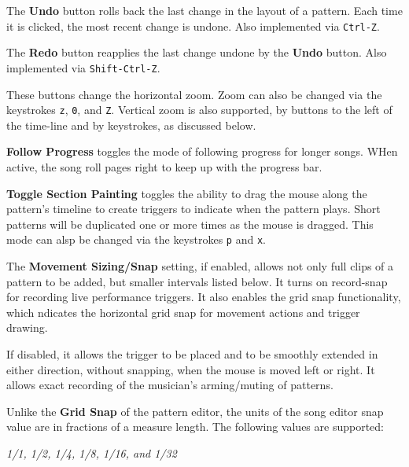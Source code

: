    The \textbf{Undo} button rolls back the last change in the layout of a
   pattern.  Each time it is clicked, the most recent change is undone.
   Also implemented via \texttt{Ctrl-Z}.

   The \textbf{Redo} button reapplies the last change undone by
   the \textbf{Undo} button.
   Also implemented via \texttt{Shift-Ctrl-Z}.

   These buttons change the horizontal zoom.
   Zoom can also be changed via the keystrokes \texttt{z}, \texttt{0},
   and \texttt{Z}.
   Vertical zoom is also supported, by buttons to the left of the time-line and
   by keystrokes, as discussed below.

   \textbf{Follow Progress} toggles the mode of following progress
   for longer songs.  WHen active, the song roll pages right to keep up with
   the progress bar.

   \textbf{Toggle Section Painting} toggles the ability
   to drag the mouse along the pattern's timeline to create triggers
   to indicate when the pattern plays.
   Short patterns will be duplicated one or more times as
   the mouse is dragged.
   This mode can alsp be changed via the keystrokes \texttt{p} and
   \texttt{x}.

   The \textbf{Movement Sizing/Snap} setting,
   if enabled, allows not only full clips of a pattern to be added,
   but smaller intervals listed below.
   It turns on record-snap for recording live performance triggers.
   It also enables the grid snap functionality,
   which ndicates the horizontal grid snap for movement actions and trigger
   drawing.

   If disabled, it allows the trigger to be placed and to be smoothly extended
   in either direction, without snapping, when the mouse is moved left or
   right. It allows exact recording of the musician's arming/muting of
   patterns.

   Unlike the \textbf{Grid Snap} of the pattern editor, the units
   of the song editor snap value are in fractions of a measure length.
   The following values are supported:

   \textsl{1/1, 1/2, 1/4, 1/8, 1/16, and 1/32}

